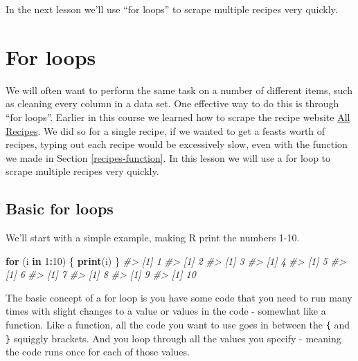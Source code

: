 \documentclass[
  12pt,
]{book}
\newenvironment{Shaded}{\begin{snugshade}}{\end{snugshade}}
\newcommand{\CommentTok}[1]{\textcolor[rgb]{0.37,0.37,0.37}{\textit{#1}}}
\newcommand{\ControlFlowTok}[1]{\textcolor[rgb]{0.27,0.27,0.27}{\textbf{#1}}}
\newcommand{\DecValTok}[1]{\textcolor[rgb]{0.06,0.06,0.06}{#1}}
\newcommand{\KeywordTok}[1]{\textcolor[rgb]{0.27,0.27,0.27}{\textbf{#1}}}
\newcommand{\NormalTok}[1]{#1}
\newcommand{\OperatorTok}[1]{\textcolor[rgb]{0.43,0.43,0.43}{\textbf{#1}}}
\begin{document}
In the next lesson we'll use ``for loops'' to scrape multiple recipes very quickly.

\hypertarget{for-loops}{%
\chapter{For loops}\label{for-loops}}

We will often want to perform the same task on a number of different items, such as cleaning every column in a data set. One effective way to do this is through ``for loops''. Earlier in this course we learned how to scrape the recipe website \href{https://www.allrecipes.com/}{All Recipes}. We did so for a single recipe, if we wanted to get a feasts worth of recipes, typing out each recipe would be excessively slow, even with the function we made in Section \ref{recipes-function}. In this lesson we will use a for loop to scrape multiple recipes very quickly.

\hypertarget{basic-for-loops}{%
\section{Basic for loops}\label{basic-for-loops}}

We'll start with a simple example, making R print the numbers 1-10.

\begin{Shaded}
\begin{Highlighting}[]
\ControlFlowTok{for}\NormalTok{ (i }\ControlFlowTok{in} \DecValTok{1}\OperatorTok{:}\DecValTok{10}\NormalTok{) \{}
   \KeywordTok{print}\NormalTok{(i)}
\NormalTok{\}}
\CommentTok{\#\textgreater{} [1] 1}
\CommentTok{\#\textgreater{} [1] 2}
\CommentTok{\#\textgreater{} [1] 3}
\CommentTok{\#\textgreater{} [1] 4}
\CommentTok{\#\textgreater{} [1] 5}
\CommentTok{\#\textgreater{} [1] 6}
\CommentTok{\#\textgreater{} [1] 7}
\CommentTok{\#\textgreater{} [1] 8}
\CommentTok{\#\textgreater{} [1] 9}
\CommentTok{\#\textgreater{} [1] 10}
\end{Highlighting}
\end{Shaded}

The basic concept of a for loop is you have some code that you need to run many times with slight changes to a value or values in the code - somewhat like a function. Like a function, all the code you want to use goes in between the \texttt{\{} and \texttt{\}} squiggly brackets. And you loop through all the values you specify - meaning the code runs once for each of those values.
\end{document}
